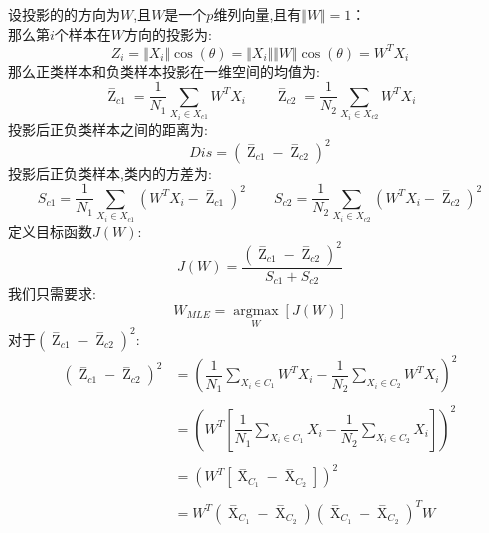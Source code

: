\documentclass[withoutpreface,bwprint]{cumcmthesis} %
\begin{document}
	设投影的的方向为$W$,且$ W$是一个$p$维列向量,且有$\Vert W \Vert=1$：\\
	那么第$i$个样本在$W$方向的投影为:
	\begin{equation}
		Z_i=\Vert X_i \Vert\cos(\theta)=\Vert X_i \Vert \Vert W \Vert\cos(\theta)=W^TX_i
	\end{equation}
	那么正类样本和负类样本投影在一维空间的均值为:
	\begin{equation}
		{\mathop{Z} \limits^{-}}_{c1}=\dfrac{1}{N_1}\sum_{X_i \in X_{c1}}W^TX_i \quad \quad
		{\mathop{Z} \limits^{-}}_{c2}=\dfrac{1}{N_2}\sum_{X_i \in X_{c2}}W^TX_i
	\end{equation}
	投影后正负类样本之间的距离为:
	\begin{equation}
		Dis=\left( {\mathop{Z} \limits^{-}}_{c1} - {\mathop{Z} \limits^{-}}_{c2}\right)^2
	\end{equation}
	投影后正负类样本,类内的方差为:
	\begin{equation}
		S_{c1}=\dfrac{1}{N_1}{\sum_{X_i \in X_{c1}}}{\left( W^TX_i-{\mathop{Z} \limits^{-}}_{c1}\right)^2}
		\quad\quad
		S_{c2}=\dfrac{1}{N_2}{\sum_{X_i \in X_{c2}}}{\left( W^TX_i-{\mathop{Z} \limits^{-}}_{c2}\right)^2}
	\end{equation}
	定义目标函数$J(W)$:
	\begin{equation}
		J(W)=\dfrac{\left( {\mathop{Z} \limits^{-}}_{c1} - {\mathop{Z} \limits^{-}}_{c2}\right)^2}
		{S_{c1}+S_{c2}}
	\end{equation}
	我们只需要求:
	\begin{equation}
		W_{MLE}={\mathop{argmax}\limits_{W}} \left[J(W)\right]
	\end{equation}
	对于$\left( {\mathop{Z} \limits^{-}}_{c1} - {\mathop{Z} \limits^{-}}_{c2}\right)^2$:
	\begin{align*}
		\left( {\mathop{Z} \limits^{-}}_{c1} - {\mathop{Z} \limits^{-}}_{c2}\right)^2 &=\left(\dfrac{1}{N_1}\sum_{X_i \in C_1}W^TX_i-\dfrac{1}{N_2}\sum_{X_i \in C_2}W^TX_i \right)^2\\
		\\&=\left(W^T \left[\dfrac{1}{N_1}\sum_{X_i \in C_1}X_i-\dfrac{1}{N_2}\sum_{X_i \in C_2}X_i\right] \right)^2\\
		\\&=\left(W^T \left[  {\mathop{X}\limits^{-}}_{C_1}-{\mathop{X}\limits^{-}}_{C_2}\right] \right)^2\\
		\\&=W^T\left({\mathop{X}\limits^{-}}_{C_1}-{\mathop{X}\limits^{-}}_{C_2} \right)\left({\mathop{X}\limits^{-}}_{C_1}-{\mathop{X}\limits^{-}}_{C_2} \right)^TW
	\end{align*}
\end{document}
